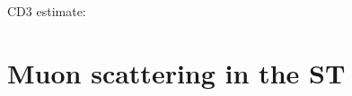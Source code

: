 \documentclass[12pt]{article}
\newcommand {\MuToEm}     {\mbox{$\mu^- \ra e^-$}}
\newcommand {\ra}        {\rightarrow}
\begin{document}
CD3 estimate: \cite{MU2E_4342_MUON_DECAYS_IN_FLIGHT_TDR}


\section {Muon scattering in the ST}

% 
% 
\end{document}
